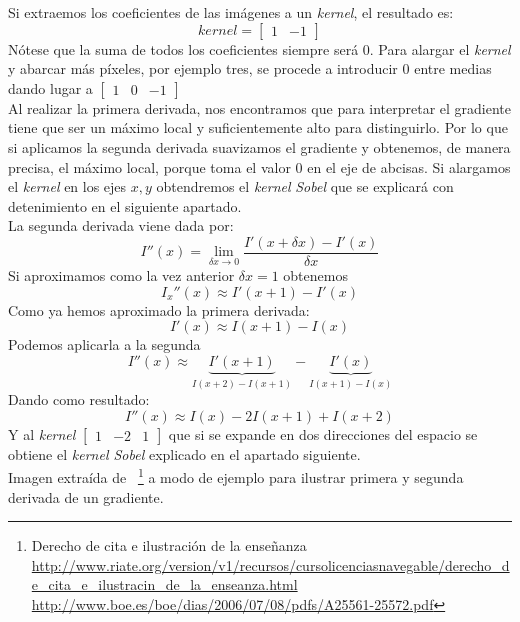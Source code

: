 Si extraemos los coeficientes de las imágenes a un \emph{kernel}, el
resultado es:
\begin{equation*}
  kernel = \begin{bmatrix}
    1 & -1
  \end{bmatrix}
\end{equation*}
Nótese que la suma de todos los coeficientes siempre será $0$. Para
alargar el \emph{kernel} y abarcar más píxeles, por ejemplo tres, se
procede a introducir $0$ entre medias dando lugar a
$\begin{bmatrix} 1 & 0 & -1 \end{bmatrix}$ \\
Al realizar la primera derivada, nos encontramos que para interpretar
el gradiente tiene que ser un máximo local y suficientemente alto para
distinguirlo. Por lo que si aplicamos la segunda derivada suavizamos
el gradiente y obtenemos, de manera precisa, el máximo local, porque
toma el valor $0$ en el eje de abcisas. Si alargamos el \emph{kernel}
en los ejes $x, y$ obtendremos el \emph{kernel}
\emph{Sobel} que se explicará con detenimiento en el siguiente apartado. \\
La segunda derivada viene dada por:
\begin{equation*}
  I''(x) = \lim_{\delta x \to 0}\frac{I'(x+\delta x) - I'(x)}{\delta x}
\end{equation*}
Si aproximamos como la vez anterior $\delta x = 1$ obtenemos
\begin{equation*}
  I_x''(x) \approx I'(x + 1) - I'(x)
\end{equation*}
Como ya hemos aproximado la primera derivada:
\begin{equation*}
  I'(x) \approx I(x + 1) - I(x)
\end{equation*}
Podemos aplicarla a la segunda
\begin{equation*}
  I''(x) \approx \underbrace{I'(x + 1)}_{I(x + 2) - I(x + 1)} - \underbrace{I'(x)}_{I(x + 1) - I(x)}
\end{equation*}
Dando como resultado:
\begin{equation*}
  I''(x) \approx I(x) - 2I(x + 1) + I(x + 2)
\end{equation*}
Y al \emph{kernel} $\begin{bmatrix} 1 & -2 & 1 \end{bmatrix}$ que si
se expande en dos direcciones del espacio se obtiene el \emph{kernel
  Sobel} explicado en el apartado siguiente.\\
Imagen extraída de \emph{\citep*{opencv_book-bib}}~\footnote{Derecho
  de
  cita e ilustración de la enseñanza\\
  \url{http://www.riate.org/version/v1/recursos/cursolicenciasnavegable/derecho_de_cita_e_ilustracin_de_la_enseanza.html}\\
  \url{http://www.boe.es/boe/dias/2006/07/08/pdfs/A25561-25572.pdf}} a
modo de ejemplo para ilustrar primera y segunda derivada de un
gradiente.

